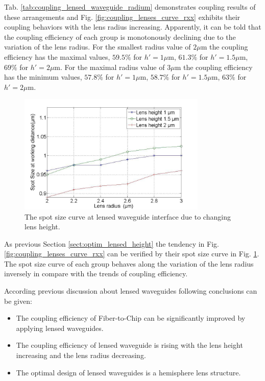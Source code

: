 Tab. \ref{tab:coupling_lensed_waveguide_radium} demonstrates coupling results of these arrangements and Fig. \ref{fig:coupling_lenses_curve_rxx} exhibits their coupling behaviors with the lens radius increasing. Apparently, it can be told that the coupling efficiency of each group is monotonously declining due to the variation of the lens radius. For the smallest radius value of $2\mu$m the coupling efficiency has the maximal values, $59.5\%$ for $h'=1\mu$m, $61.3\%$ for $h'=1.5\mu$m, $69\%$ for $h'=2\mu$m. For the maximal radius value of $3\mu$m the coupling efficiency has the minimum values, $57.8\%$ for $h'=1\mu$m, $58.7\%$ for $h'=1.5\mu$m, $63\%$ for $h'=2\mu$m.\\

\begin{figure}[!ht]
\centering
\includegraphics[width=0.8\textwidth]{bilder/spot_fix_lens_height_rxx}
\caption{The spot size curve at lensed waveguide interface due to changing lens height.}
\label{fig:lensed_guide_spot_size_curve_rxx}
\end{figure}
As previous Section \ref{sect:optim_lensed_height} the tendency in Fig. \ref{fig:coupling_lenses_curve_rxx} can be verified by their spot size curve in Fig. \ref{fig:lensed_guide_spot_size_curve_rxx}. The spot size curve of each group behaves along the variation of the lens radius inversely in compare with the trends of coupling efficiency. 

 According previous discussion about lensed waveguides following conclusions can be given: 
\begin{itemize} 
\item The coupling efficiency of Fiber-to-Chip can be significantly improved by applying lensed waveguides.  
\item The coupling efficiency of lensed waveguide is rising with the lens height increasing and the lens radius decreasing.
\item The optimal design of lensed waveguides is a hemisphere lens structure. 
\end{itemize}

